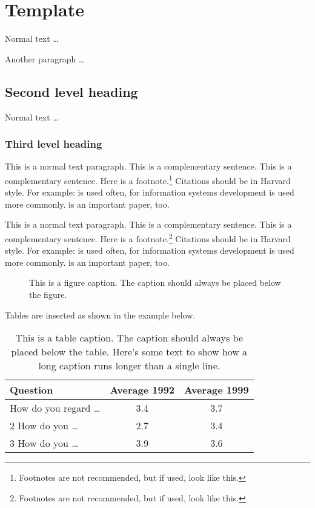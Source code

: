 \chapter{Template}

Normal text \dots

Another paragraph \dots

\section{Second level heading}

Normal text \dots

\subsection{Third level heading} %

This is a normal text paragraph. This is a complementary sentence. This is a complementary sentence. Here is a footnote.\footnote{Footnotes are not recommended, but if used, look like this.} Citations should be in Harvard style. For example: \citet{markus.1988} is used often, for information systems development \citep{ward_benefits_2012} is used more commonly. \citet[p.~275]{kautz.1994} is an important paper, too.

This is a normal text paragraph. This is a complementary sentence. This is a complementary sentence. Here is a footnote.\footnote{Footnotes are not recommended, but if used, look like this.} Citations should be in Harvard style. For example: \citet[p.~275]{ward_managing_2007} is used often, for information systems development \citep{avison.1995} is used more commonly. \citet[p.~275]{kautz.1994} is an important paper, too.


\begin{figure}[H]
  \ECISfigureexample %
  \caption{This is a figure caption. The caption should always be placed below the figure.}
\end{figure}

\noindent %
Tables are inserted as shown in the example below.

\begin{table}[H]
  \begin{tabular}{@{}|l|c|c|@{}}
    \hline
    \bigstrut[t] Question                  & Average 1992 & Average 1999\\
    \hline
    \bigstrut[t] 1 How do you regard \dots & 3.4 & 3.7\\
                 2 How do you \dots        & 2.7 & 3.4\\
                 3 How do you \dots        & 3.9 & 3.6\\
    \hline
  \end{tabular}
  \caption{This is a table caption. The caption should always be placed below the table. Here's some text to show how a long caption runs longer than a single line.}
\end{table}

